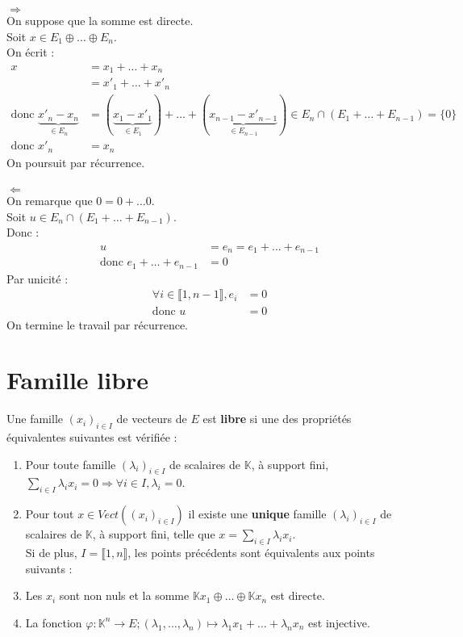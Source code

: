 \documentclass[../main.tex]{subfiles}
\begin{document}
$\boxed{\Rightarrow}$ \\
On suppose que la somme est directe. \\
Soit $x \in E_1 \oplus \ldots \oplus E_n$. \\
On écrit : 
\begin{align*}
    x &= x_1 + \ldots + x_n \\
    &= x'_1 + \ldots + x'_n \\
    \text{donc } \underbrace{x'_n - x_n}_{\in E_n} &= (\underbrace{x_1 - x'_1}_{\in E_1}) + \ldots + (\underbrace{x_{n-1} - x'_{n-1}}_{\in E_{n-1}}) \in E_n \cap (E_1 + \ldots + E_{n-1}) = \{0\} \\
    \text{donc } x'_n &= x_n
\end{align*}
On poursuit par récurrence. \\ \\

$\boxed{\Leftarrow}$ \\
On remarque que $0 = 0 + \ldots 0$. \\
Soit $u \in E_n \cap (E_1 + \ldots + E_{n-1})$. \\
Donc : 
\begin{align*}
    u &= e_n = e_1 + \ldots + e_{n-1} \\
    \text{donc } e_1 + \ldots + e_{n-1} &= 0
\end{align*}
Par unicité : 
\begin{align*}
    \forall i \in \llbracket 1, n-1 \rrbracket, e_i &= 0 \\
    \text{donc } u &= 0
\end{align*}
On termine le travail par récurrence. 

\section{Famille libre}
\begin{tcolorbox}[title=Propostion 20.51, title filled=false, colframe=lightblue, colback=lightblue!10!white]
    Une famille $(x_i)_{i\in I}$ de vecteurs de $E$ est \textbf{libre} si une des propriétés équivalentes suivantes est vérifiée :
    \begin{enumerate}
        \item Pour toute famille $(\lambda_i)_{i\in I}$ de scalaires de $\mathbb{K}$, à support fini, $\sum\limits_{i\in I} \lambda_i x_i = 0 \Rightarrow \forall i \in I, \lambda_i = 0$.
        \item Pour tout $x \in Vect((x_i)_{i\in I})$ il existe une \textbf{unique} famille $(\lambda_i)_{i\in I}$ de scalaires de $\mathbb{K}$, à support fini, telle que $x = \sum\limits_{i\in I} \lambda_i x_i$. \\
        Si de plus, $I = \llbracket 1, n \rrbracket$, les points précédents sont équivalents aux points suivants :
        \item Les $x_i$ sont non nuls et la somme $\mathbb{K} x_1 \oplus \ldots \oplus \mathbb{K} x_n$ est directe. 
        \item La fonction $\varphi:\mathbb{K}^n\to E; (\lambda_1, \ldots, \lambda_n) \mapsto \lambda_1 x_1 + \ldots + \lambda_n x_n$ est injective.
    \end{enumerate}
\end{tcolorbox}
\end{document}
